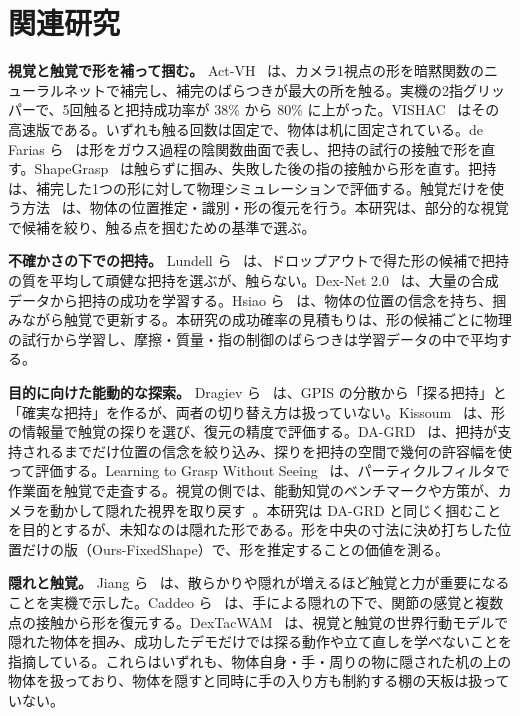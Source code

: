 \documentclass[conference]{IEEEtran}
\newcommand{\Fix}{Ours-FixedShape}
\begin{document}
\section{関連研究}

\textbf{視覚と触覚で形を補って掴む。} Act-VH~\cite{rustler2022actvh} は、カメラ1視点の形を暗黙関数のニューラルネットで補完し、補完のばらつきが最大の所を触る。実機の2指グリッパーで、5回触ると把持成功率が 38\% から 80\% に上がった。VISHAC~\cite{rustler2023efficient} はその高速版である。いずれも触る回数は固定で、物体は机に固定されている。de Farias ら~\cite{defarias2021simultaneous} は形をガウス過程の陰関数曲面で表し、把持の試行の接触で形を直す。ShapeGrasp~\cite{rustler2026shapegrasp} は触らずに掴み、失敗した後の指の接触から形を直す。把持は、補完した1つの形に対して物理シミュレーションで評価する。触覚だけを使う方法~\cite{kamtikar2026tactful,pai2023tactofind,kissoum2023tactile} は、物体の位置推定・識別・形の復元を行う。本研究は、部分的な視覚で候補を絞り、触る点を掴むための基準で選ぶ。

\textbf{不確かさの下での把持。} Lundell ら~\cite{lundell2019robust} は、ドロップアウトで得た形の候補で把持の質を平均して頑健な把持を選ぶが、触らない。Dex-Net 2.0~\cite{mahler2017dexnet2} は、大量の合成データから把持の成功を学習する。Hsiao ら~\cite{hsiao2011robust} は、物体の位置の信念を持ち、掴みながら触覚で更新する。本研究の成功確率の見積もりは、形の候補ごとに物理の試行から学習し、摩擦・質量・指の制御のばらつきは学習データの中で平均する。

\textbf{目的に向けた能動的な探索。} Dragiev ら~\cite{dragiev2013uncertainty} は、GPIS の分散から「探る把持」と「確実な把持」を作るが、両者の切り替え方は扱っていない。Kissoum~\cite{kissoum2023tactile} は、形の情報量で触覚の探りを選び、復元の精度で評価する。DA-GRD~\cite{wang2026dagrd} は、把持が支持されるまでだけ位置の信念を絞り込み、探りを把持の空間で幾何の許容幅を使って評価する。Learning to Grasp Without Seeing~\cite{murali2018grasp} は、パーティクルフィルタで作業面を触覚で走査する。視覚の側では、能動知覚のベンチマークや方策が、カメラを動かして隠れた視界を取り戻す~\cite{luo2026recovering,liu2026sapave}。本研究は DA-GRD と同じく掴むことを目的とするが、未知なのは隠れた形である。形を中央の寸法に決め打ちした位置だけの版（\Fix）で、形を推定することの価値を測る。

\textbf{隠れと触覚。} Jiang ら~\cite{jiang2026touchmatter} は、散らかりや隠れが増えるほど触覚と力が重要になることを実機で示した。Caddeo ら~\cite{caddeo2026physgen} は、手による隠れの下で、関節の感覚と複数点の接触から形を復元する。DexTacWAM~\cite{yuan2026dextacwam} は、視覚と触覚の世界行動モデルで隠れた物体を掴み、成功したデモだけでは探る動作や立て直しを学べないことを指摘している。これらはいずれも、物体自身・手・周りの物に隠された机の上の物体を扱っており、物体を隠すと同時に手の入り方も制約する棚の天板は扱っていない。
\end{document}
